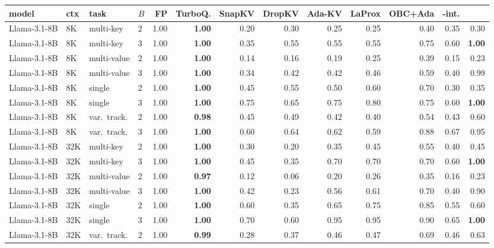 \begin{tabular}{@{}llllrrrrrrrrr@{}}
\toprule
model & ctx & task & $B$ & FP & TurboQ. & SnapKV & DropKV & Ada-KV & LaProx & OBC+Ada & \sieve{}-int. & \sieve{} \\
\midrule
Llama-3.1-8B & 8K & multi-key & 2 & 1.00 & \textbf{1.00} & 0.20 & 0.30 & 0.25 & 0.25 & 0.40 & 0.35 & 0.30 \\
Llama-3.1-8B & 8K & multi-key & 3 & 1.00 & \textbf{1.00} & 0.35 & 0.55 & 0.55 & 0.55 & 0.75 & 0.60 & \textbf{1.00} \\
Llama-3.1-8B & 8K & multi-value & 2 & 1.00 & \textbf{1.00} & 0.14 & 0.16 & 0.19 & 0.25 & 0.39 & 0.15 & 0.23 \\
Llama-3.1-8B & 8K & multi-value & 3 & 1.00 & \textbf{1.00} & 0.34 & 0.42 & 0.42 & 0.46 & 0.59 & 0.40 & 0.99 \\
Llama-3.1-8B & 8K & single & 2 & 1.00 & \textbf{1.00} & 0.45 & 0.55 & 0.50 & 0.60 & 0.70 & 0.30 & 0.35 \\
Llama-3.1-8B & 8K & single & 3 & 1.00 & \textbf{1.00} & 0.75 & 0.65 & 0.75 & 0.80 & 0.75 & 0.60 & \textbf{1.00} \\
Llama-3.1-8B & 8K & var.\ track. & 2 & 1.00 & \textbf{0.98} & 0.45 & 0.49 & 0.42 & 0.40 & 0.54 & 0.43 & 0.60 \\
Llama-3.1-8B & 8K & var.\ track. & 3 & 1.00 & \textbf{1.00} & 0.60 & 0.64 & 0.62 & 0.59 & 0.88 & 0.67 & 0.95 \\
\addlinespace[1pt]
Llama-3.1-8B & 32K & multi-key & 2 & 1.00 & \textbf{1.00} & 0.30 & 0.20 & 0.35 & 0.45 & 0.55 & 0.40 & 0.45 \\
Llama-3.1-8B & 32K & multi-key & 3 & 1.00 & \textbf{1.00} & 0.45 & 0.35 & 0.70 & 0.70 & 0.70 & 0.60 & \textbf{1.00} \\
Llama-3.1-8B & 32K & multi-value & 2 & 1.00 & \textbf{0.97} & 0.12 & 0.06 & 0.20 & 0.26 & 0.35 & 0.16 & 0.23 \\
Llama-3.1-8B & 32K & multi-value & 3 & 1.00 & \textbf{1.00} & 0.42 & 0.23 & 0.56 & 0.61 & 0.70 & 0.40 & 0.90 \\
Llama-3.1-8B & 32K & single & 2 & 1.00 & \textbf{1.00} & 0.60 & 0.35 & 0.65 & 0.75 & 0.85 & 0.55 & 0.60 \\
Llama-3.1-8B & 32K & single & 3 & 1.00 & \textbf{1.00} & 0.70 & 0.60 & 0.95 & 0.95 & 0.90 & 0.65 & \textbf{1.00} \\
Llama-3.1-8B & 32K & var.\ track. & 2 & 1.00 & \textbf{0.99} & 0.28 & 0.37 & 0.46 & 0.47 & 0.69 & 0.46 & 0.63 \\

\end{tabular}

